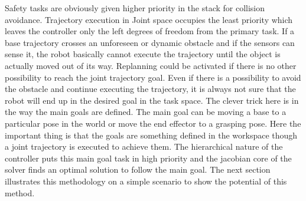 Safety tasks are obviously given higher priority in the stack for collision avoidance. Trajectory execution in Joint space occupies the least priority which leaves the controller only the left degrees of freedom from the primary task. If a base trajectory crosses an unforeseen or dynamic obstacle and if the sensors can sense it, the robot basically cannot execute the trajectory until the object is actually moved out of its way. Replanning could be activated if there is no other possibility to reach the joint trajectory goal. Even if there is a possibility to avoid the obstacle and continue executing the  trajectory, it is always not sure that the robot will end up in the desired goal in the task space. The clever trick here is in the way the main goals are defined. The main goal can be moving a base to a particular pose in the world or move the end effector to a grasping pose. Here the important thing is that the goals are something defined in the workspace though a joint trajectory is executed to achieve them. The hierarchical nature of the controller puts this main goal task in high priority and the jacobian core of the solver finds an optimal solution to follow the main goal. The next section illustrates this methodology on a simple scenario to show the potential of this method.

